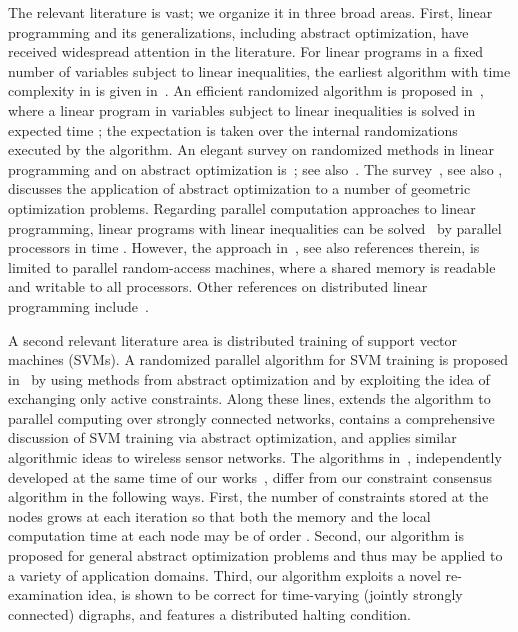 \documentclass[onecolumn,journal,letterpaper]{IEEEtran}
\begin{document}
The relevant literature is vast; we organize it in three broad
areas. First, linear programming and its generalizations, including
abstract optimization, have received widespread attention in the
literature. For linear programs in a fixed number of variables subject to
 linear inequalities, the earliest algorithm with time complexity in
 is given in~\cite{NM:84}.  An efficient randomized algorithm is
proposed in~\cite{JM-MS-EW:96}, where a linear program in  variables
subject to  linear inequalities is solved in expected time ; the expectation is taken over the internal
randomizations executed by the algorithm.  An elegant survey on randomized
methods in linear programming and on abstract optimization
is~\cite{BG-EW:96}; see also~\cite{MG:95,BG-EW:01}.  The
survey~\cite{PKA-SS:01}, see also \cite{PKA-MS:98}, discusses the
application of abstract optimization to a number of geometric optimization
problems.  Regarding parallel computation approaches to linear programming,
linear programs with  linear inequalities can be solved~\cite{MA-NM:96}
by  parallel processors in time .  However, the
approach in~\cite{MA-NM:96}, see also references therein, is limited to
parallel random-access machines, where a shared memory is readable and
writable to all processors.  Other references on distributed linear
programming include~\cite{YB-JWB-DR:04,HD-HK:08}.



A second relevant literature area is distributed training of support vector
machines (SVMs).  A randomized parallel algorithm for SVM training is
proposed in~\cite{YL-VR:06} by using methods from abstract optimization and
by exploiting the idea of exchanging only active constraints. Along these
lines, \cite{YL-VR-LV:08} extends the algorithm to parallel computing over
strongly connected networks, \cite{JB-YD-JT-OW:08} contains a comprehensive
discussion of SVM training via abstract optimization, and
\cite{KF-BBL-PT:06} applies similar algorithmic ideas to wireless sensor
networks.  The algorithms in~\cite{YL-VR:06,YL-VR-LV:08}, independently
developed at the same time of our
works~\cite{GN-FB:06d,GN-FB:06z,GN-FB:08x}, differ from our constraint
consensus algorithm in the following ways.  First, the number of
constraints stored at the nodes grows at each iteration so that both the
memory and the local computation time at each node may be of order .
Second, our algorithm is proposed for general abstract optimization
problems and thus may be applied to a variety of application
domains. Third, our algorithm exploits a novel re-examination idea, is
shown to be correct for time-varying (jointly strongly connected) digraphs,
and features a distributed halting condition.
\end{document}
